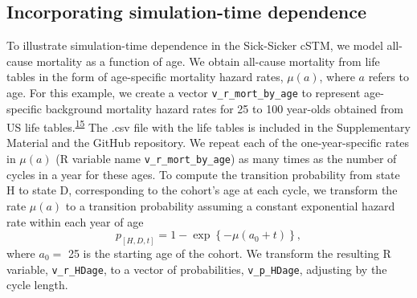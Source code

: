 \documentclass[
]{article}
\begin{document}
\hypertarget{incorporating-simulation-time-dependence}{%
\subsection{Incorporating simulation-time dependence}\label{incorporating-simulation-time-dependence}}

To illustrate simulation-time dependence in the Sick-Sicker cSTM, we model all-cause mortality as a function of age. We obtain all-cause mortality from life tables in the form of age-specific mortality hazard rates, \(\mu(a)\), where \(a\) refers to age. For this example, we create a vector \texttt{v\_r\_mort\_by\_age} to represent age-specific background mortality hazard rates for 25 to 100 year-olds obtained from US life tables.\textsuperscript{\protect\hyperlink{ref-Arias2017}{15}} The .csv file with the life tables is included in the Supplementary Material and the GitHub repository. We repeat each of the one-year-specific rates in \(\mu(a)\) (R variable name \texttt{v\_r\_mort\_by\_age}) as many times as the number of cycles in a year for these ages. To compute the transition probability from state H to state D, corresponding to the cohort's age at each cycle, we transform the rate \(\mu(a)\) to a transition probability assuming a constant exponential hazard rate within each year of age
\[
  p_{[H,D,t]} = 1-\exp\left\{{-\mu(a_0 + t)}\right\},
\]
where \(a_0 =\) 25 is the starting age of the cohort. We transform the resulting R variable, \texttt{v\_r\_HDage}, to a vector of probabilities, \texttt{v\_p\_HDage}, adjusting by the cycle length.
\end{document}
